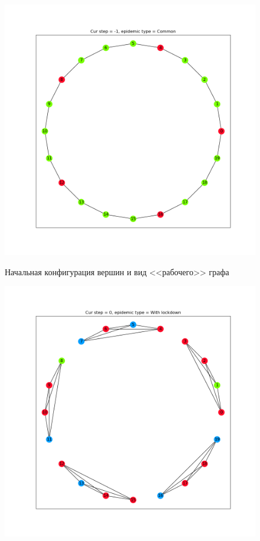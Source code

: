 	\begin{figure}[h]
		\begin{center}
			\begin{minipage}{0.49\linewidth}
				\includegraphics[width=\linewidth, keepaspectratio]{../figs/evidence3/init}
				
				\centering
				Начальная конфигурация вершин и вид <<рабочего>> графа
			\end{minipage}
			\begin{minipage}{0.49\linewidth}
				\includegraphics[width=\linewidth, keepaspectratio]{../figs/evidence3/start_with_ld}
				

\end{minipage}
\end{center}
\end{figure}
